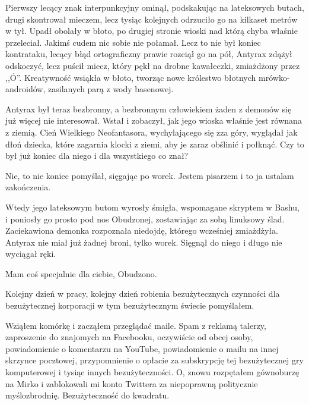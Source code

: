 Pierwszy lecący znak interpunkcyjny ominął, podskakując na lateksowych butach, drugi skontrował mieczem, lecz tysiąc kolejnych odrzuciło go na kilkaset metrów w tył.
Upadł obolały w błoto, po drugiej stronie wioski nad którą chyba właśnie przeleciał. Jakimś cudem nic sobie nie połamał.
Lecz to nie był koniec kontrataku, lecący błąd ortograficzny prawie rozciął go na pół, Antyrax zdążył odskoczyć, lecz puścił miecz, który pękł na drobne kawałeczki, zmiażdżony przez ,,Ó''.
Kreatywność wsiąkła w błoto, tworząc nowe królestwo błotnych mrówko-androidów, zasilanych parą z wody basenowej.

Antyrax był teraz bezbronny, a bezbronnym człowiekiem żaden z demonów się już więcej nie interesował. Wstał i zobaczył, jak jego wioska właśnie jest równana z ziemią.
Cień Wielkiego Neofantasora, wychylającego się zza góry, wyglądał jak dłoń dziecka, które zagarnia klocki z ziemi, aby je zaraz obślinić i połknąć.
Czy to był już koniec dla niego i dla wszystkiego co znał?

\begin{dialogue}
\ds Nie, to nie koniec \dm pomyślał, sięgając po worek. \dm Jestem pisarzem i to ja ustalam zakończenia. 
\end{dialogue}

Wtedy jego lateksowym butom wyrosły śmigła, wspomagane skryptem w Bashu, i poniosły go prosto pod nos Obudzonej, zostawiając za sobą linuksowy ślad.
Zaciekawiona demonka rozpoznała niedojdę, którego wcześniej zmiażdżyła.
Antyrax nie miał już żadnej broni, tylko worek. Sięgnął do niego i długo nie wyciągał ręki.
\begin{dialogue}
\ds{} Mam coś specjalnie dla ciebie, Obudzono.
\end{dialogue}

\divider{}

\begin{dialogue}
\ds{} Kolejny dzień w pracy, kolejny dzień robienia bezużytecznych czynności dla bezużytecznej korporacji w tym bezużytecznym świecie \dm{} pomyślałem.
\end{dialogue}

Wziąłem komórkę i zacząłem przeglądać maile.
Spam z reklamą talerzy, zaproszenie do znajomych na Facebooku, oczywiście od obcej osoby, powiadomienie o komentarzu na YouTube,
powiadomienie o mailu na innej skrzynce pocztowej, przypomnienie o opłacie za subskrypcję tej bezużytecznej gry komputerowej i tysiąc innych bezużyteczności.
O, znowu rozpętałem gównoburzę na Mirko i zablokowali mi konto Twittera za niepoprawną politycznie myślozbrodnię.
Bezużyteczność do kwadratu.

